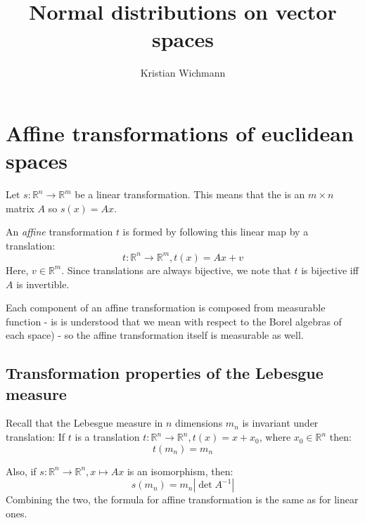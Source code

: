 \documentclass[12pt, a4paper]{article}
\title{Normal distributions on vector spaces}
\author{Kristian Wichmann}
\numberwithin{equation}{section}
\begin{document}
\maketitle

\section{Affine transformations of euclidean spaces}
Let $s:\mathbb{R}^n\rightarrow\mathbb{R}^m$ be a linear transformation. This means that the is an $m\times n$ matrix $A$ so $s(x)=Ax$.

An \textit{affine} transformation $t$ is formed by following this linear map by a translation:
\begin{equation}
t:\mathbb{R}^n\rightarrow\mathbb{R}^m, t(x)=Ax+v
\end{equation}
Here, $v\in\mathbb{R}^m$. Since translations are always bijective, we note that $t$ is bijective iff $A$ is invertible.

Each component of an affine transformation is composed from measurable function - is is understood that we mean with respect to the Borel algebras of each space) - so the affine transformation itself is measurable as well.

\subsection{Transformation properties of the Lebesgue measure}
\label{euclidean_lebesgue_properties}
Recall that the Lebesgue measure in $n$ dimensions $m_n$ is invariant under translation: If $t$ is a translation $t:\mathbb{R}^n\rightarrow\mathbb{R}^n, t(x)=x+x_0$, where $x_0\in\mathbb{R}^n$ then:
\begin{equation}
t(m_n)=m_n
\end{equation}

Also, if $s:\mathbb{R}^n\rightarrow\mathbb{R}^n, x\mapsto Ax$ is an isomorphism, then:
\begin{equation}
s(m_n)=m_n|\det A^{-1}|
\end{equation}
Combining the two, the formula for affine transformation is the same as for linear ones.
\end{document}
